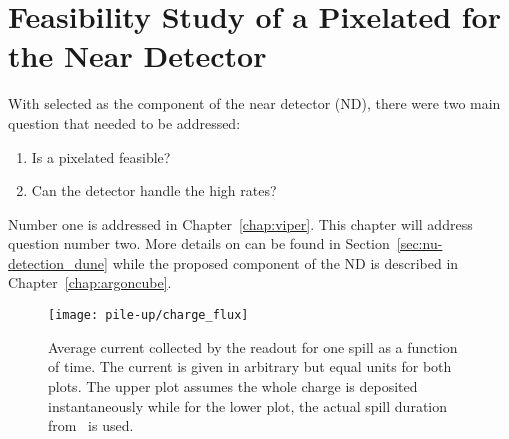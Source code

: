 \chapter{Feasibility Study of a Pixelated \lartpc{} for the \dune{} Near Detector}
\label{chap:dune-nd}

With \AC{} selected as  the \lar{} component of the \dune{} near detector (ND), there were two main question that needed to be addressed:
\begin{enumerate}
	\item Is a pixelated \lartpc{} feasible?
	\item Can the \lar{} detector handle the high rates?
\end{enumerate}
Number one is addressed in Chapter~\ref{chap:viper}.
This chapter will address question number two.
More details on \dune{} can be found in Section~\ref{sec:nu-detection_dune} while the proposed \AC{} \lar{} component of the ND is described in Chapter~\ref{chap:argoncube}.

\begin{figure}[htb]
	\centering
	\texttt{[image: pile-up/charge\_flux]}
	\caption{Average current collected by the readout for one spill as a function of time.
	The current is given in arbitrary but equal units for both plots.
	The upper plot assumes the whole charge is deposited instantaneously while for the lower plot, the actual spill duration from~\cite{dune2} is used.}
	\label{fig:dune-nd_charge-flux}
\end{figure}

